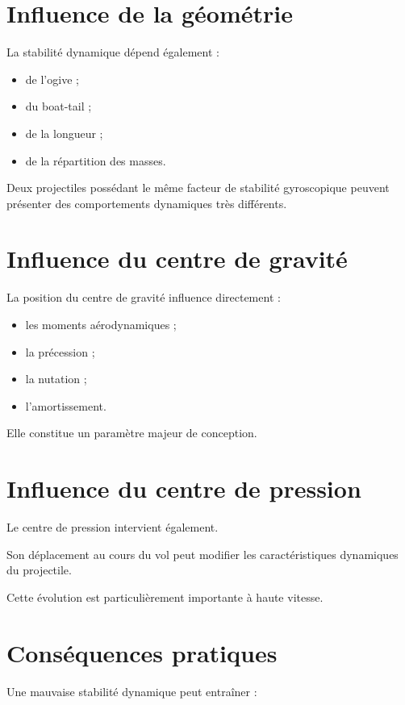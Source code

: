 \section{Influence de la géométrie}

La stabilité dynamique dépend également :

\begin{itemize}
    \item de l'ogive ;
    \item du boat-tail ;
    \item de la longueur ;
    \item de la répartition des masses.
\end{itemize}

Deux projectiles possédant le même facteur de stabilité gyroscopique peuvent
présenter des comportements dynamiques très différents.

\section{Influence du centre de gravité}

La position du centre de gravité influence directement :

\begin{itemize}
    \item les moments aérodynamiques ;
    \item la précession ;
    \item la nutation ;
    \item l'amortissement.
\end{itemize}

Elle constitue un paramètre majeur de conception.

\section{Influence du centre de pression}

Le centre de pression intervient également.

Son déplacement au cours du vol peut modifier les caractéristiques
dynamiques du projectile.

Cette évolution est particulièrement importante à haute vitesse.

\section{Conséquences pratiques}

Une mauvaise stabilité dynamique peut entraîner :

